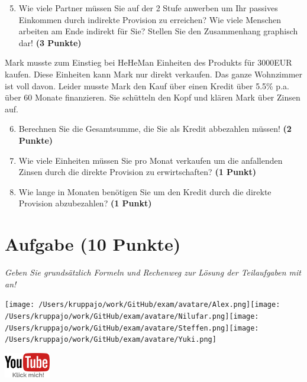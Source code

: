 \documentclass[a4paper, 9pt]{scrartcl}\usepackage[]{graphicx}\usepackage[]{xcolor}
\begin{document}
\begin{enumerate}
  \setcounter{enumi}{4}
\item Wie viele Partner müssen Sie auf der 2 Stufe anwerben um Ihr passives Einkommen durch indirekte Provision zu erreichen? Wie viele Menschen arbeiten am Ende indirekt für Sie? Stellen Sie den Zusammenhang graphisch dar!  \textbf{(3 Punkte)}
\end{enumerate}

Mark musste zum Einstieg bei HeHeMan Einheiten des Produkts für 3000EUR kaufen. Diese Einheiten kann Mark nur direkt verkaufen. Das ganze Wohnzimmer ist voll davon. Leider musste Mark den Kauf über einen Kredit über 5.5\% p.a. über 60 Monate finanzieren. Sie schütteln den Kopf und klären Mark über Zinsen auf.

\begin{enumerate}
  \setcounter{enumi}{5}
\item Berechnen Sie die Gesamtsumme, die Sie als Kredit abbezahlen müssen! \textbf{(2 Punkte)}
\item Wie viele Einheiten müssen Sie pro Monat verkaufen um die anfallenden Zinsen durch die direkte Provision zu erwirtschaften? \textbf{(1 Punkt)}
\item Wie lange in Monaten benötigen Sie um den Kredit durch die direkte Provision abzubezahlen? \textbf{(1 Punkt)}
\end{enumerate} 
\clearpage

\section{Aufgabe \hfill (10 Punkte)}

\textit{Geben Sie grundsätzlich Formeln und Rechenweg zur Lösung der Teilaufgaben mit an!} \\[1Ex]
 

 
\begin{minipage}[t]{0.5\textwidth}
\texttt{[image: /Users/kruppajo/work/GitHub/exam/avatare/Alex.png]}\hspace{-4mm}\texttt{[image: /Users/kruppajo/work/GitHub/exam/avatare/Nilufar.png]}\hspace{-4mm}\texttt{[image: /Users/kruppajo/work/GitHub/exam/avatare/Steffen.png]}\hspace{-4mm}\texttt{[image: /Users/kruppajo/work/GitHub/exam/avatare/Yuki.png]}
\end{minipage}
\begin{minipage}[t]{0.5\textwidth}
\hfill
\href{https://youtu.be/8Pb2sKUIMyk}{\includegraphics[width = 2cm]{img/youtube}}
\end{minipage}
\end{document}
